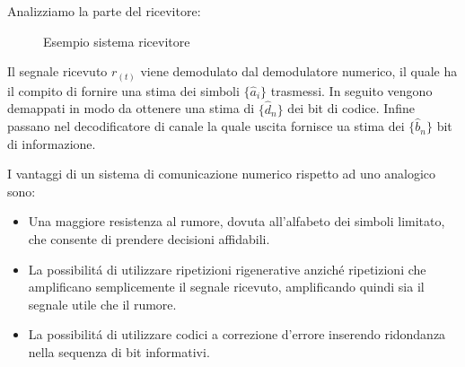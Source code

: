     Analizziamo la parte del ricevitore:
    \begin{figure}[H]
        \centering
        \caption{Esempio sistema ricevitore}
    \end{figure}
    Il segnale ricevuto $r_{(t)}$ viene demodulato dal demodulatore numerico, il quale ha il compito di fornire una stima dei simboli $\{\hat{a}_i\}$ trasmessi.
    In seguito vengono demappati in modo da ottenere una stima di $\{\hat{d}_n\}$ dei bit di codice. Infine passano nel decodificatore di canale la quale uscita 
    fornisce ua stima dei $\{\hat{b}_n\}$ bit di informazione.

    I vantaggi di un sistema di comunicazione numerico rispetto ad uno analogico sono:
    \begin{itemize}
        \item {
            Una maggiore resistenza al rumore, dovuta all'alfabeto dei simboli limitato, che consente di prendere decisioni affidabili.
        }
        \item {
            La possibilitá di utilizzare ripetizioni rigenerative anziché ripetizioni che amplificano semplicemente il segnale ricevuto, amplificando quindi sia il segnale
            utile che il rumore. 
        }
        \item {
            La possibilitá di utilizzare codici a correzione d'errore inserendo ridondanza nella sequenza di bit informativi.
        }
    \end{itemize}
